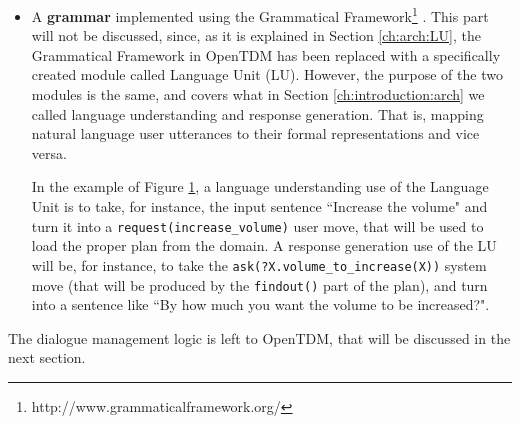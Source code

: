 \begin{itemize}
Figure \ref{ch:arch:client:increaseplan} shows the plan item, as it is defined in the application domain: we notice that the \texttt{plan} section is a list of two elements, a \texttt{findout()} function, that will ask the user for the amount of volume to increase, and a \texttt{dev\_perform()} function, that will fire the volume increasing method in the device.
\begin{figure}
\begin{Verbatim}[frame=single]
{
  "goal": "increase_volume",
  "plan": [
              "findout(?X.volume_to_increase(X))",
              "dev_perform(
			   IncreaseVolume,
			   MplayDevice,
			   {postconfirm=True}
			  )"
	   ],
  "postconds": ["done(IncreaseVolume)"]
}
\end{Verbatim}
\caption{The \texttt{increase\_volume} plan of \pname.}
\label{ch:arch:client:increaseplan}
\end{figure}
\item A \textbf{grammar} implemented using the Grammatical Framework\footnote{http://www.grammaticalframework.org/} \citep{citeulike:346448}. This part will not be discussed, since, as it is explained in Section \ref{ch:arch:LU}, the Grammatical Framework in OpenTDM has been replaced with a specifically created module called Language Unit (LU). However, the purpose of the two modules is the same, and covers what in Section \ref{ch:introduction:arch} we called language understanding and response generation. That is, mapping natural language user utterances to their formal representations and vice versa.

In the example of Figure \ref{ch:arch:client:increaseplan}, a language understanding use of the Language Unit is to take, for instance, the input sentence ``Increase the volume" and turn it into a \texttt{request(increase\_volume)} user move, that will be used to load the proper plan from the domain. A response generation use of the LU will be, for instance, to take the \texttt{ask(?X.volume\_to\_increase(X))} system move (that will be produced by the \texttt{findout()} part of the plan), and turn into a sentence like ``By how much you want the volume to be increased?".
\end{itemize}

The dialogue management logic is left to OpenTDM, that will be discussed in the next section.



